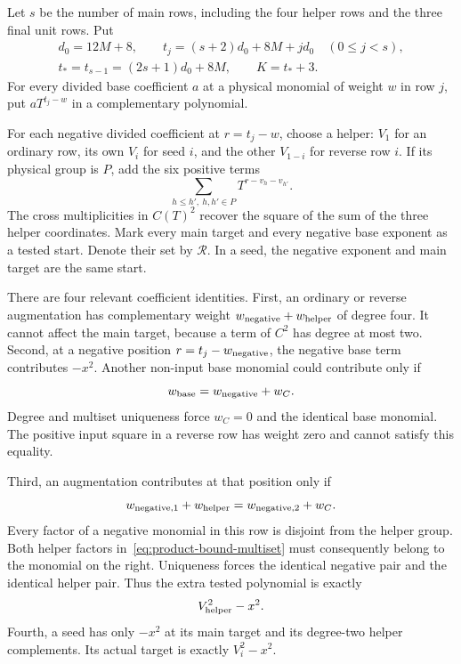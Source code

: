 Let $s$ be the number of main rows, including the four helper rows
and the three final unit rows. Put
\begin{equation}\label{eq:product-bound-layout}
\begin{gathered}
 d_0=12M+8,\qquad
 t_j=(s+2)d_0+8M+jd_0\quad(0\le j<s),\\
 t_*=t_{s-1}=(2s+1)d_0+8M,\qquad K=t_*+3.
\end{gathered}
\end{equation}
For every divided base coefficient $a$ at a physical monomial of
weight $w$ in row $j$, put $aT^{t_j-w}$ in a complementary polynomial.

For each negative divided coefficient at $r=t_j-w$, choose a helper:
$V_1$ for an ordinary row, its own $V_i$ for seed $i$, and the other
$V_{1-i}$ for reverse row $i$. If its physical group is $P$, add
the six positive terms
\begin{equation}\label{eq:product-bound-augmentation}
 \sum_{h\le h',\ h,h'\in P}T^{r-v_h-v_{h'}}.
\end{equation}
The cross multiplicities in $C(T)^2$ recover the square of the sum
of the three helper coordinates. Mark every main target and every
negative base exponent as a tested start. Denote their set by
$\mathcal R$. In a seed, the negative exponent and main target are
the same start.

There are four relevant coefficient identities. First, an ordinary
or reverse augmentation has complementary weight
$w_{\rm negative}+w_{\rm helper}$ of degree four. It cannot affect
the main target, because a term of $C^2$ has degree at most two.
Second, at a negative position $r=t_j-w_{\rm negative}$, the negative
base term contributes $-x^2$. Another non-input base monomial could
contribute only if
\[
 w_{\rm base}=w_{\rm negative}+w_C.
\]
Degree and multiset uniqueness force $w_C=0$ and the identical base
monomial. The positive input square in a reverse row has weight zero
and cannot satisfy this equality.

Third, an augmentation contributes at that position only if
\begin{equation}\label{eq:product-bound-multiset}
 w_{{\rm negative},1}+w_{\rm helper}=w_{{\rm negative},2}+w_C.
\end{equation}
Every factor of a negative monomial in this row is disjoint from the
helper group. Both helper factors in~\eqref{eq:product-bound-multiset}
must consequently belong to the monomial on the right. Uniqueness
forces the identical negative pair and the identical helper pair.
Thus the extra tested polynomial is exactly
\begin{equation}\label{eq:product-bound-extra-target}
 V_{\rm helper}^2-x^2.
\end{equation}
Fourth, a seed has only $-x^2$ at its main target and its degree-two
helper complements. Its actual target is exactly $V_i^2-x^2$.

